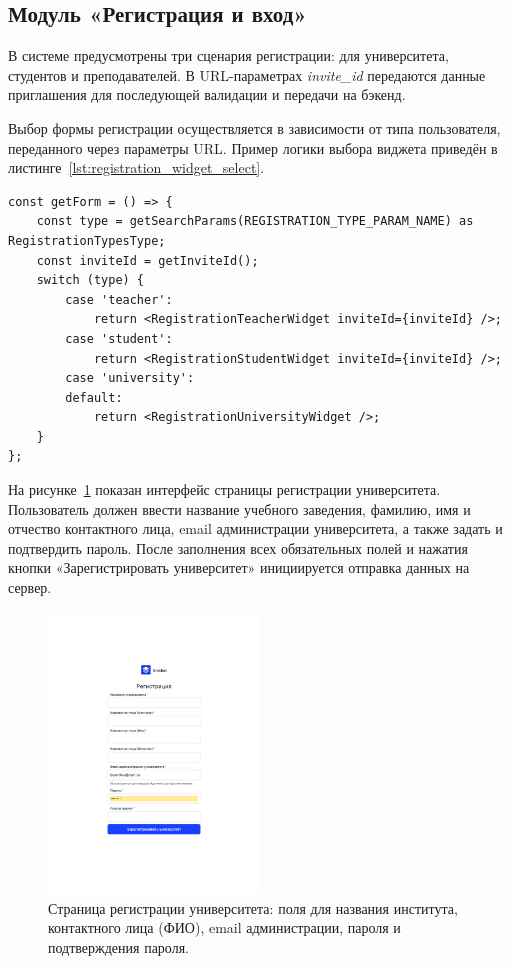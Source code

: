 \subsection{Модуль «Регистрация и вход»}

В системе предусмотрены три сценария регистрации: для университета, студентов и преподавателей. В URL-параметрах \textit{invite\_id} передаются данные приглашения для последующей валидации и передачи на бэкенд.

Выбор формы регистрации осуществляется в зависимости от типа пользователя, переданного через параметры URL. Пример логики выбора виджета приведён в листинге~\ref{lst:registration_widget_select}.

\begin{lstlisting}[caption={Выбор виджета регистрации по типу}, label={lst:registration_widget_select}]
const getForm = () => {
    const type = getSearchParams(REGISTRATION_TYPE_PARAM_NAME) as RegistrationTypesType;
    const inviteId = getInviteId();
    switch (type) {
        case 'teacher':
            return <RegistrationTeacherWidget inviteId={inviteId} />;
        case 'student':
            return <RegistrationStudentWidget inviteId={inviteId} />;
        case 'university':
        default:
            return <RegistrationUniversityWidget />;
    }
};
\end{lstlisting}
На рисунке~\ref{fig:registration_university} показан интерфейс страницы регистрации университета. Пользователь должен ввести название учебного заведения, фамилию, имя и отчество контактного лица, email администрации университета, а также задать и подтвердить пароль. После заполнения всех обязательных полей и нажатия кнопки «Зарегистрировать университет» инициируется отправка данных на сервер.

\begin{figure}[h]
    \centering
    \includegraphics[width=0.5\textwidth]{static/presintation/RegPage.png} %
    \caption{Страница регистрации университета: поля для названия института, контактного лица (ФИО), email администрации, пароля и подтверждения пароля.}
    \label{fig:registration_university}
\end{figure}


